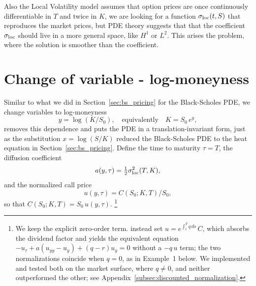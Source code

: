 Also the Local Volatility model assumes that option prices are once continuously differentiable
in $T$ and twice in $K$,
we are looking for a function $\sigma_{\mathrm{loc}}(t,S)$ that reproduces the market prices,
but PDE theory suggests that that the coefficient $\sigma_{\mathrm{loc}}$ should live in a more general space, like $H^1$ or $L^2$.
This arises the problem, where the solution is smoother than the coefficient.


\section{Change of variable - log-moneyness}\label{sec:change_variable}

Similar to what we did in Section~\ref{sec:bs_pricing} for the Black-Scholes PDE,
we change variables to log-moneyness
\begin{equation*}
    y = \log(K/S_0), \quad \text{equivalently} \quad K = S_0\,e^{y},
\end{equation*}
removes this dependence and puts the PDE in a translation-invariant form,
just as the substitution $x = \log(S/K)$ reduced the Black-Scholes PDE to the heat
equation in Section~\ref{sec:bs_pricing}.
Define the time to maturity $\tau = T$,
the diffusion coefficient
\begin{equation*}
    a(y,\tau) = \tfrac{1}{2}\sigma_{\mathrm{loc}}^2(T,K),
\end{equation*}
and the normalized call price
\begin{equation*}
    u(y,\tau) = C(S_0; K, T)/S_0,
\end{equation*}
so that $C(S_0; K, T) = S_0\,u(y,\tau)$.
\footnote{We keep the explicit zero-order term. \cite{egger2005tikhonov} instead set
$u = e^{\int_t^T q\,ds}\,C$, which absorbs the dividend factor and yields the
equivalent equation $-u_\tau + a(u_{yy}-u_y) + (q-r)u_y = 0$ without a $-q\,u$ term;
the two normalizations coincide when $q = 0$, as in Example~1 below. We implemented and
tested both on the market surface, where $q \neq 0$, and neither outperformed the other;
see Appendix~\ref{subsec:discounted_normalization}.}


